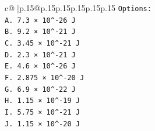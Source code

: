 \documentclass{article}
\begin{document}
{\begin{supertabular}{c@{$\;$}|p{.15\linewidth}@{}p{.15\linewidth}p{.15\linewidth}p{.15\linewidth}p{.15\linewidth}p{.15\linewidth}}
{{{\texttt{Options:} \\
\texttt{A. 7.3 × 10\^{}{-}26 J} \\
\texttt{B. 9.2 × 10\^{}{-}21 J} \\
\texttt{C. 3.45 × 10\^{}{-}21 J} \\
\texttt{D. 2.3 × 10\^{}{-}21 J} \\
\texttt{E. 4.6 × 10\^{}{-}26 J} \\
\texttt{F. 2.875 × 10\^{}{-}20 J} \\
\texttt{G. 6.9 × 10\^{}{-}22 J} \\
\texttt{H. 1.15 × 10\^{}{-}19 J} \\
\texttt{I. 5.75 × 10\^{}{-}21 J} \\
\texttt{J. 1.15 × 10\^{}{-}20 J} \\
            }
        }
    }
     \\ \\


\end{supertabular}}
\end{document}
